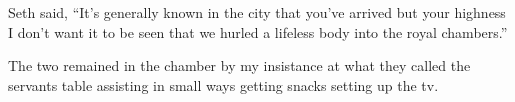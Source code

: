Seth said, ``It's generally known in the city that you've arrived but your highness I don't want it to be seen that we hurled a lifeless body into the royal chambers.''

The two remained in the chamber by my insistance at what they called the servants table assisting in small ways getting snacks setting up the tv.







 